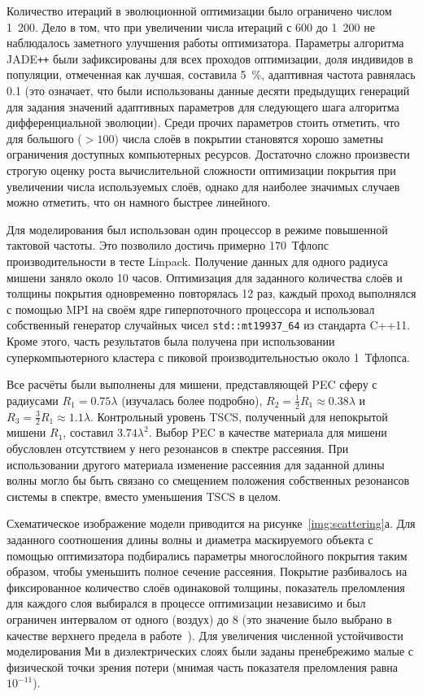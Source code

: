 Количество итераций в эволюционной оптимизации было ограничено числом
1~200. Дело в том, что при увеличении числа итераций с 600 до 1~200 не
наблюдалось заметного улучшения работы оптимизатора. 
Параметры алгоритма JADE\texttt{++} были зафиксированы для всех проходов
оптимизации, доля индивидов в популяции, отмеченная как лучшая,
составила 5~\%, адаптивная частота равнялась 0.1 (это означает, что
были использованы данные десяти предыдущих генераций для задания
значений адаптивных параметров для следующего шага алгоритма
дифференциальной эволюции).  Среди прочих параметров стоить отметить,
что для большого ($>100$) числа слоёв в покрытии становятся хорошо
заметны ограничения доступных компьютерных ресурсов. Достаточно
сложно произвести строгую оценку роста вычислительной сложности
оптимизации покрытия при увеличении числа используемых слоёв, однако
для наиболее значимых случаев можно отметить, что он намного быстрее
линейного.

Для моделирования был использован один процессор в режиме повышенной
тактовой частоты. Это позволило достичь примерно 170~Тфлопс
производительности в тесте Linpack. Получение данных для одного
радиуса мишени заняло около 10 часов. Оптимизация для
заданного количества слоёв и толщины покрытия одновременно повторялась
12 раз, каждый проход выполнялся с помощью MPI на своём
ядре гиперпоточного процессора и использовал собственный генератор
случайных чисел \verb+std::mt19937_64+ из стандарта C++11. Кроме
этого, часть результатов была получена при использовании
суперкомпьютерного кластера с пиковой производительностью около
1~Тфлопса.

Все расчёты были выполнены для мишени, представляющей PEC сферу с
радиусами ${R_1 = 0.75\lambda}$ (изучалась более подробно),
${R_2 = \frac{1}{2}R_1\approx 0.38\lambda}$ и
${R_3 = \frac{3}{2}R_1 \approx 1.1\lambda}$.  Контрольный уровень
TSCS, полученный для непокрытой мишени ${R_1}$, составил
$3.74\lambda^2$.  Выбор PEC в качестве материала для мишени обусловлен
отсутствием у него резонансов в спектре рассеяния. При использовании
другого материала изменение рассеяния для заданной длины волны могло
бы быть связано со смещением положения собственных резонансов системы
в спектре, вместо уменьшения TSCS в целом.

Схематическое изображение модели приводится на
рисунке~\ref{img:scattering}а. Для заданного соотношения длины волны
и диаметра маскируемого объекта с помощью оптимизатора подбирались
параметры многослойного покрытия таким образом, чтобы уменьшить полное
сечение рассеяния.  Покрытие разбивалось на фиксированное количество
слоёв одинаковой толщины, показатель преломления для каждого слоя
выбирался в процессе оптимизации независимо и был ограничен интервалом
от одного (воздух) до $8$ (это значение было выбрано в качестве
верхнего предела в работе~\cite{semouchkina2}).  Для увеличения
численной устойчивости моделирования Ми в диэлектрических слоях были
заданы пренебрежимо малые с физической точки зрения потери (мнимая
часть показателя преломления равна $10^{-11}$).


